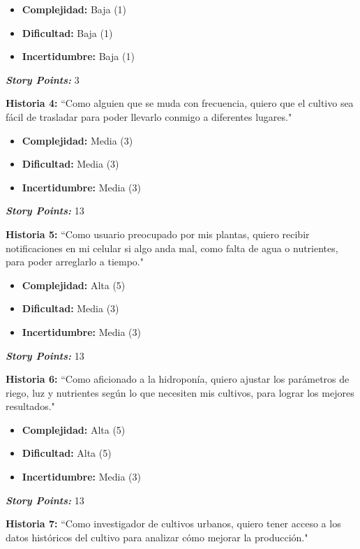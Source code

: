 \documentclass[
11pt, %
]{charter}
\begin{document}
        \begin{itemize}
            \item \textbf{Complejidad:} Baja (1)
            \item \textbf{Dificultad:} Baja (1)
            \item \textbf{Incertidumbre:} Baja (1)
        \end{itemize}
        \textit{\textbf{Story Points:}} 3

\textbf{Historia 4:} ``Como alguien que se muda con frecuencia, quiero que el cultivo sea fácil de trasladar para poder llevarlo conmigo a diferentes lugares."

        \begin{itemize}
            \item \textbf{Complejidad:} Media (3)
            \item \textbf{Dificultad:} Media (3)
            \item \textbf{Incertidumbre:} Media (3)
        \end{itemize}
        \textit{\textbf{Story Points:}} 13

 \textbf{Historia 5:} ``Como usuario preocupado por mis plantas, quiero recibir notificaciones en mi celular si algo anda mal, como falta de agua o nutrientes, para poder arreglarlo a tiempo."

        \begin{itemize}
            \item \textbf{Complejidad:} Alta (5)
            \item \textbf{Dificultad:} Media (3)
            \item \textbf{Incertidumbre:} Media (3)
        \end{itemize}
        \textit{\textbf{Story Points:}} 13

 \textbf{Historia 6:} ``Como aficionado a la hidroponía, quiero ajustar los parámetros de riego, luz y nutrientes según lo que necesiten mis cultivos, para lograr los mejores resultados."

        \begin{itemize}
            \item \textbf{Complejidad:} Alta (5)
            \item \textbf{Dificultad:} Alta (5)
            \item \textbf{Incertidumbre:} Media (3)
        \end{itemize}
       \textit{\textbf{Story Points:}} 13

 \textbf{Historia 7:} ``Como investigador de cultivos urbanos, quiero tener acceso a los datos históricos del cultivo para analizar cómo mejorar la producción."
\end{document}
